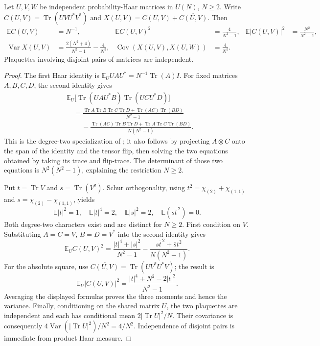 \begin{lemma}
Let \(U,V,W\) be independent probability-Haar matrices in \(U(N)\),
\(N\geq2\). Write \(C(U,V)=\operatorname{Tr}(UVU^*V^*)\) and
\(X(U,V)=C(U,V)+\overline{C(U,V)}\). Then
\begin{align*}
 \mathbb E C(U,V)&=N^{-1},&
 \mathbb E C(U,V)^2&=\frac4{N^2-1},&
 \mathbb E|C(U,V)|^2&=\frac{N^2}{N^2-1},\\
 \operatorname{Var}X(U,V)&=
       \frac{2(N^2+4)}{N^2-1}-\frac4{N^2},&
 \operatorname{Cov}(X(U,V),X(U,W))&=\frac4{N^2}.
\end{align*}
Plaquettes involving disjoint pairs of matrices are independent.
\end{lemma}
\begin{proof}
The first Haar identity is
\(\mathbb E_U UAU^*=N^{-1}\operatorname{Tr}(A)I\).
For fixed matrices \(A,B,C,D\), the second identity gives
\begin{align*}
 &\mathbb E_U\bigl[\operatorname{Tr}(UAU^*B)
                    \operatorname{Tr}(UCU^*D)\bigr]\\
 &\quad=\frac{\operatorname{Tr}A\operatorname{Tr}B
                    \operatorname{Tr}C\operatorname{Tr}D
                    +\operatorname{Tr}(AC)\operatorname{Tr}(BD)}{N^2-1}\\
 &\qquad\ -\frac{\operatorname{Tr}(AC)\operatorname{Tr}B\operatorname{Tr}D
                    +\operatorname{Tr}A\operatorname{Tr}C\operatorname{Tr}(BD)}
                    {N(N^2-1)}.
\end{align*}
This is the degree-two specialization of
\citet[Corollary~2.4]{collinssniady2006integration}; it also follows by
projecting \(A\otimes C\) onto the span of the identity and the tensor flip,
then solving the two equations obtained by taking its trace and flip-trace.
The determinant of those two equations is \(N^2(N^2-1)\), explaining
the restriction \(N\geq2\).

Put \(t=\operatorname{Tr}V\) and \(s=\operatorname{Tr}(V^2)\).
Schur orthogonality, using
\(t^2=\chi_{(2)}+\chi_{(1,1)}\) and
\(s=\chi_{(2)}-\chi_{(1,1)}\), yields
\[
 \mathbb E|t|^2=1,\quad \mathbb E|t|^4=2,\quad
 \mathbb E|s|^2=2,\quad \mathbb E(s\overline t^{\,2})=0.
\]
Both degree-two characters exist and are distinct for \(N\geq2\).
First condition on \(V\). Substituting \(A=C=V\), \(B=D=V^*\)
into the second identity gives
\[
 \mathbb E_U C(U,V)^2
 =\frac{|t|^4+|s|^2}{N^2-1}
   -\frac{s\overline t^{\,2}+\overline s t^2}{N(N^2-1)}.
\]
For the absolute square, use
\(\overline{C(U,V)}=\operatorname{Tr}(UV^*U^*V)\); the result is
\[
 \mathbb E_U|C(U,V)|^2
     =\frac{|t|^4+N^2-2|t|^2}{N^2-1}.
\]
Averaging the displayed formulas proves the three moments and hence the
variance. Finally, conditioning on the shared matrix \(U\), the two
plaquettes are independent and each has conditional mean
\(2|\operatorname{Tr}U|^2/N\). Their covariance is consequently
\(4\operatorname{Var}(|\operatorname{Tr}U|^2)/N^2=4/N^2\).
Independence of disjoint pairs is immediate from product Haar measure.
\end{proof}

